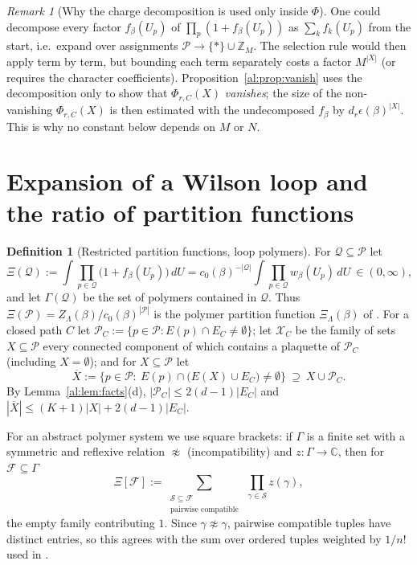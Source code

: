\documentclass[11pt,a4paper]{article}
\theoremstyle{definition}
\newtheorem{definition}[theorem]{Definition}
\theoremstyle{remark}
\newtheorem{remark}[theorem]{Remark}
\newcommand{\C}{\mathbb{C}}
\newcommand{\Z}{\mathbb{Z}}
\newcommand{\cP}{\mathcal{P}}
\newcommand{\dU}{\,dU}
\newcommand{\cX}{\mathcal{X}}
\newcommand{\cQ}{\mathcal{Q}}
\newcommand{\cS}{\mathcal{S}}
\newcommand{\Fref}[3]{\cite[#1~`#2' (\texttt{#3})]{F}}
\begin{document}
\begin{remark}[Why the charge decomposition is used only inside $\Phi$]\label{al:rem:whyinside}
One could decompose every factor $f_\beta(U_p)$ of $\prod_p(1+f_\beta(U_p))$ as $\sum_kf_k(U_p)$ from the start, i.e.\
expand over assignments $\cP\to\{*\}\cup\Z_M$. The selection rule would then apply term by term, but bounding each term
separately costs a factor $M^{|X|}$ (or requires the character coefficients). Proposition~\ref{al:prop:vanish} uses the
decomposition only to show that $\Phi_{r,C}(X)$ \emph{vanishes}; the size of the non-vanishing $\Phi_{r,C}(X)$ is then
estimated with the undecomposed $f_\beta$ by $d_r\epsilon(\beta)^{|X|}$. This is why no constant below depends on $M$ or
$N$.
\end{remark}

\section{Expansion of a Wilson loop and the ratio of partition functions}\label{al:sec:expansion}

\begin{definition}[Restricted partition functions, loop polymers]\label{al:def:Xi}
For $\cQ\subseteq\cP$ let
\[
\Xi(\cQ):=\int\prod_{p\in\cQ}\bigl(1+f_\beta(U_p)\bigr)\dU=c_0(\beta)^{-|\cQ|}\int\prod_{p\in\cQ}w_\beta(U_p)\dU\ \in(0,\infty),
\]
and let $\Gamma(\cQ)$ be the set of polymers contained in $\cQ$. Thus $\Xi(\cP)=Z_\Lambda(\beta)/c_0(\beta)^{|\cP|}$
is the polymer partition function $\Xi_\Lambda(\beta)$ of \Fref{Proposition}{Polymer representation}{prop:polymer}.
For a closed path $C$ let $\cP_C:=\{p\in\cP:E(p)\cap E_C\neq\emptyset\}$; let $\cX_C$ be the family of sets
$X\subseteq\cP$ every connected component of which contains a plaquette of $\cP_C$ (including $X=\emptyset$); and for
$X\subseteq\cP$ let
\[
\overline X:=\{p\in\cP:\ E(p)\cap\bigl(E(X)\cup E_C\bigr)\neq\emptyset\}\ \supseteq\ X\cup\cP_C .
\]
By Lemma~\ref{al:lem:facts}(d), $|\cP_C|\le2(d-1)|E_C|$ and $|\overline X|\le(K+1)|X|+2(d-1)|E_C|$.
\end{definition}

For an abstract polymer system we use square brackets: if $\Gamma$ is a finite set with a symmetric and reflexive
relation $\not\approx$ (incompatibility) and $z:\Gamma\to\C$, then for $\mathcal F\subseteq\Gamma$
\begin{equation}\label{al:eq:abstractXi}
\Xi[\mathcal F]:=\sum_{\substack{\cS\subseteq\mathcal F\\ \text{pairwise compatible}}}\ \prod_{\gamma\in\cS}z(\gamma),
\end{equation}
the empty family contributing $1$. Since $\gamma\not\approx\gamma$, pairwise compatible tuples have distinct entries, so
this agrees with the sum over ordered tuples weighted by $1/n!$ used in \cite{F}.
\end{document}
